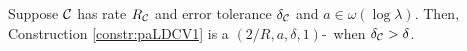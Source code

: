 \begin{theorem}\label{thm:paLDCV1}
    Suppose $\mathcal{C}$ has rate $R_{\mathcal{C}}$ and error tolerance $\delta_{\mathcal{C}}$ and $a \in \omega(\log \lambda).$ 
    Then, Construction \ref{constr:paLDCV1} is a $\left(2/R,a,\delta,1\right)$-\paLDC\ when $\delta_{\mathcal{C}} > \delta$.
\end{theorem}